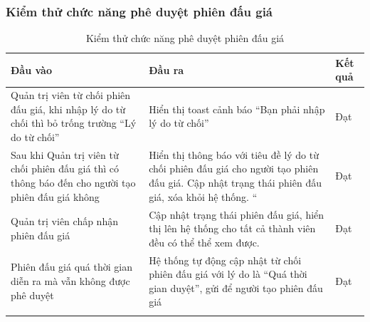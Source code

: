 \documentclass{article}
\begin{document}
\subsubsection{Kiểm thử chức năng phê duyệt phiên đấu giá}
    \begin{longtable}{| p{}|p{}|p{}|} 
    \hline
        \bfseries Đầu vào & \bfseries Đầu ra & \bfseries Kết quả\\\hline
        Quản trị viên từ chối phiên đấu giá, khi nhập lý do từ chối thì bỏ trống trường “Lý do từ chối”
        & Hiển thị toast cảnh báo “Bạn phải nhập lý do từ chối”&Đạt \\\hline
        Sau khi Quản trị viên từ chối phiên đấu giá thì có thông báo đến cho người tạo phiên đấu giá không
        & Hiển thị thông báo với tiêu đề lý do từ chối phiên đấu giá cho người tạo phiên đấu giá. Cập nhật trạng thái phiên đấu giá, xóa khỏi hệ thống. “&Đạt \\\hline
        Quản trị viên chấp nhận phiên đấu giá
        & Cập nhật trạng thái phiên đấu giá, hiển thị lên hệ thống cho tất cả thành viên đều có thể thể xem được. &Đạt \\\hline
        Phiên đấu giá quá thời gian diễn ra mà vẫn không được phê duyệt
        & Hệ thống tự động cập nhật từ chối phiên đấu giá với lý do là “Quá thời gian duyệt”, gửi để người tạo phiên đấu giá&Đạt \\\hline
    \caption{Kiểm thử chức năng phê duyệt phiên đấu giá}
    \label{bang415}
    \end{longtable}
\end{document}
